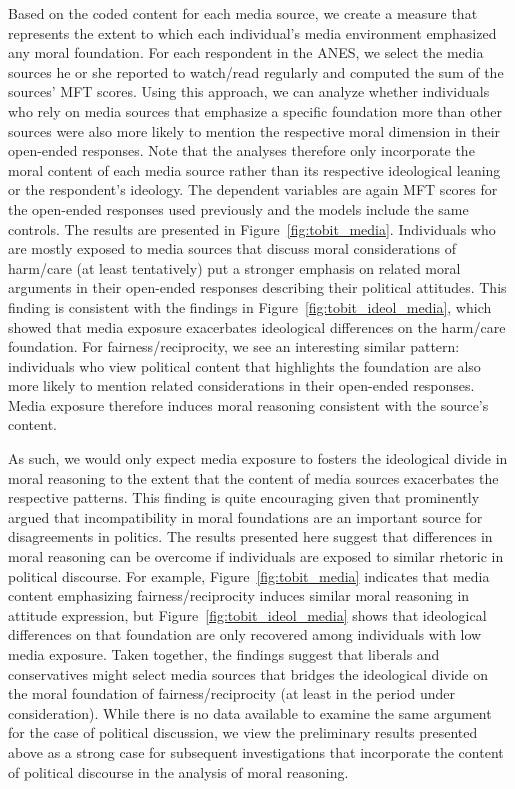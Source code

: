 \documentclass[12pt]{article}
\begin{document}
Based on the coded content for each media source, we create a measure that represents the extent to which each individual's media environment emphasized any moral foundation. For each respondent in the ANES, we select the media sources he or she reported to watch/read regularly and computed the sum of the sources' MFT scores. Using this approach, we can analyze whether individuals who rely on media sources that emphasize a specific foundation more than other sources were also more likely to mention the respective moral dimension in their open-ended responses. Note that the analyses therefore only incorporate the moral content of each media source rather than its respective ideological leaning or the respondent's ideology.  The dependent variables are again MFT scores for the open-ended responses used previously and the models include the same controls. The results are presented in Figure~\ref{fig:tobit_media}. Individuals who are mostly exposed to media sources that discuss moral considerations of harm/care (at least tentatively) put a stronger emphasis on related moral arguments in their open-ended responses describing their political attitudes. This finding is consistent with the findings in Figure~\ref{fig:tobit_ideol_media}, which showed that media exposure exacerbates ideological differences on the harm/care foundation. For fairness/reciprocity, we see an interesting similar pattern: individuals who view political content that highlights the foundation are also more likely to mention related considerations in their open-ended responses. Media exposure therefore induces moral reasoning consistent with the source's content.

As such, we would only expect media exposure to fosters the ideological divide in moral reasoning to the extent that the content of media sources exacerbates the respective patterns. This finding is quite encouraging given that \citet{haidt2012righteous} prominently argued that incompatibility in moral foundations are an important source for disagreements in politics. The results presented here suggest that differences in moral reasoning can be overcome if individuals are exposed to similar rhetoric in political discourse. For example, Figure~\ref{fig:tobit_media} indicates that media content emphasizing fairness/reciprocity induces similar moral reasoning in attitude expression, but Figure~\ref{fig:tobit_ideol_media} shows that ideological differences on that foundation are only recovered among individuals with low media exposure. Taken together, the findings suggest that liberals and conservatives might select media sources that bridges the ideological divide on the moral foundation of fairness/reciprocity (at least in the period under consideration). While there is no data available to examine the same argument for the case of political discussion, we view the preliminary results presented above as a strong case for subsequent investigations that incorporate the content of political discourse in the analysis of moral reasoning.
\end{document}
